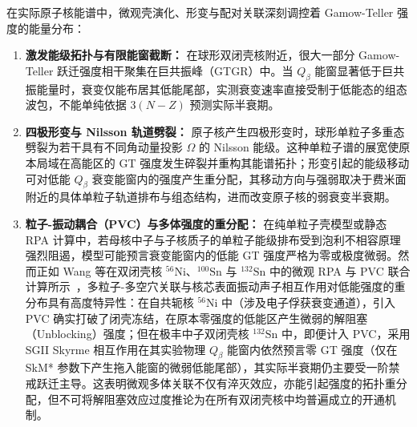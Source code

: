 在实际原子核能谱中，微观壳演化、形变与配对关联深刻调控着 Gamow-Teller 强度的能量分布：
\begin{enumerate}
\item \textbf{激发能级拓扑与有限能窗截断：} 在球形双闭壳核附近，很大一部分 Gamow-Teller 跃迁强度相干聚集在巨共振峰（GTGR）中。当 $Q_\beta$ 能窗显著低于巨共振能量时，衰变仅能布居其低能尾部，实测衰变速率直接受制于低能态的组态波包，不能单纯依据 $3(N-Z)$ 预测实际半衰期。
\item \textbf{四极形变与 Nilsson 轨道劈裂：} 原子核产生四极形变时，球形单粒子多重态劈裂为若干具有不同角动量投影 $\Omega$ 的 Nilsson 能级。这种单粒子谱的展宽使原本局域在高能区的 GT 强度发生碎裂并重构其能谱拓扑；形变引起的能级移动可对低能 $Q_\beta$ 衰变能窗内的强度产生重分配，其移动方向与强弱取决于费米面附近的具体单粒子轨道排布与组态结构，进而改变原子核的弱衰变半衰期。
\item \textbf{粒子-振动耦合（PVC）与多体强度的重分配：} 在纯单粒子壳模型或静态 RPA 计算中，若母核中子与子核质子的单粒子能级排布受到泡利不相容原理强烈阻遏，模型可能预言衰变能窗内的低能 GT 强度严格为零或极度微弱。然而正如 Wang 等在双闭壳核 $^{56}\mathrm{Ni}$、$^{100}\mathrm{Sn}$ 与 $^{132}\mathrm{Sn}$ 中的微观 RPA 与 PVC 联合计算所示~\cite{wang-2026-axial-coupling-quenching-joint-effects}，多粒子-多空穴关联与核芯表面振动声子相互作用对低能强度的重分布具有高度特异性：在自共轭核 $^{56}\mathrm{Ni}$ 中（涉及电子俘获衰变通道），引入 PVC 确实打破了闭壳冻结，在原本零强度的低能区产生微弱的解阻塞（Unblocking）强度；但在极丰中子双闭壳核 $^{132}\mathrm{Sn}$ 中，即便计入 PVC，采用 SGII Skyrme 相互作用在其实验物理 $Q_\beta$ 能窗内依然预言零 GT 强度（仅在 SkM* 参数下产生拖入能窗的微弱低能尾部），其实际半衰期仍主要受一阶禁戒跃迁主导。这表明微观多体关联不仅有淬灭效应，亦能引起强度的拓扑重分配，但不可将解阻塞效应过度推论为在所有双闭壳核中均普遍成立的开通机制。
\end{enumerate}

